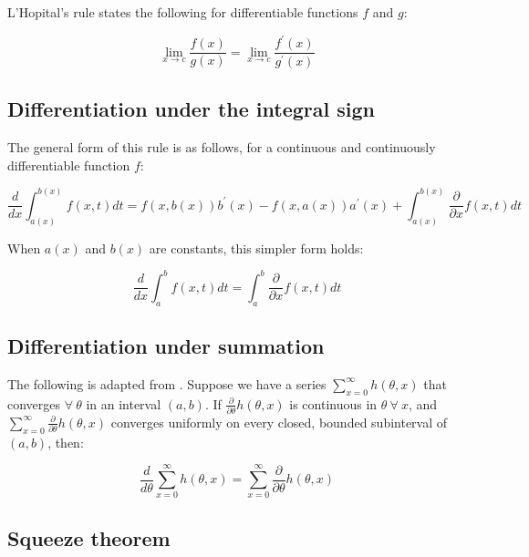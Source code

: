 \documentclass{report}
\begin{document}
L'Hopital's rule states the following for differentiable functions $f$ and $g$:

\begin{equation}\label{eq:lhopitals-rule}
    \lim_{x\to c} \frac{f(x)}{g(x)} = \lim_{x\to c} \frac{f^\prime(x)}{g^\prime(x)}
\end{equation}

\subsection{Differentiation under the integral sign}

The general form of this rule is as follows, for a continuous and continuously differentiable function $f$:

\begin{equation}\label{eq:diff-under-integral-general}
    \frac{d}{dx} \int_{a(x)}^{b(x)} f(x, t) dt = f(x, b(x))b^\prime(x) - f(x, a(x))a^\prime(x) + \int_{a(x)}^{b(x)} \frac{\partial}{\partial x} f(x, t) dt
\end{equation}

When $a(x)$ and $b(x)$ are constants, this simpler form holds:

\begin{equation}\label{eq:diff-under-integral-simple}
    \frac{d}{dx} \int_a^b f(x, t) dt = \int_a^b \frac{\partial}{\partial x} f(x, t) dt
\end{equation}

\subsection{Differentiation under summation}

The following is adapted from \cite[Chapter~2.4]{casella_statistical_2002}. Suppose we have a series $\sum_{x=0}^\infty h(\theta, x)$ that converges $\forall \: \theta$ in an interval $(a, b)$. If $\frac{\partial}{\partial\theta} h(\theta, x)$ is continuous in $\theta \: \forall \: x$, and $\sum_{x=0}^\infty \frac{\partial}{\partial\theta} h(\theta, x)$ converges uniformly on every closed, bounded subinterval of $(a, b)$, then:

\begin{equation}\label{eq:diff-under-summation}
    \frac{d}{d\theta} \sum_{x=0}^\infty h(\theta, x) = \sum_{x=0}^\infty \frac{\partial}{\partial\theta} h(\theta, x)
\end{equation}

\subsection{Squeeze theorem}
\end{document}
